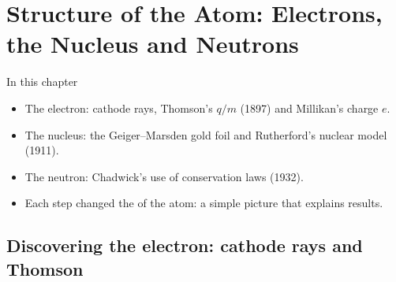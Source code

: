 %
\newcommand\chTwoNuc[3]{\ensuremath{\mathord{%
  \setbox0=\hbox{$\scriptstyle#1$}\setbox2=\hbox{$\scriptstyle#2$}%
  \ifdim\wd0<\wd2 \setbox0=\hbox to\wd2{\hss\box0}\else\setbox2=\hbox to\wd0{\hss\box2}\fi
  {}^{\box0}_{\box2}\mathrm{#3}}}}

\chapter[Structure of the Atom]{Structure of the Atom: Electrons, the Nucleus and Neutrons}\label{ch2:chap}

\begin{summarybox}{In this chapter}
\begin{itemize}
  \item The electron: cathode rays, Thomson's $q/m$ (1897) and Millikan's charge $e$.
  \item The nucleus: the Geiger--Marsden gold foil and Rutherford's nuclear model (1911).
  \item The neutron: Chadwick's use of conservation laws (1932).
  \item Each step changed the  of the atom: a simple picture that explains results.
\end{itemize}
\end{summarybox}

\section{Discovering the electron: cathode rays and Thomson}\label{ch2:sec:electron}

